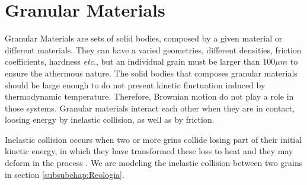 
\chapter{Granular Materials}
\label{chap:Trabalhos-Relacionados}



    Granular Materials are sets of solid bodies, composed by a given material or different materials. They can have a varied geometries, different densities, friction coefficients, hardness \textit{etc}., but an individual grain must be larger than 100$\mu m$ \cite{Sands_Powders_and_Grains} to ensure the athermous nature. The solid bodies that composes granular materials should be large enough to do not present kinetic fluctuation induced by thermodynamic temperature. Therefore, Brownian motion do not play a role in those systems. Granular materials interact each other when they are in contact, loosing energy by inelastic collision, as well as by friction.

Inelastic collision occurs when two or more grins collide losing part of their initial kinetic energy, in which they have transformed these loss to heat and they may deform in the process \cite{Halliday}. We are modeling the inelastic collision between two grains in section \ref{subsubchap:Reologia}.

